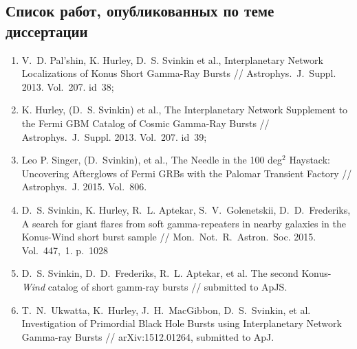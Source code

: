 \subsection*{\Large Список работ, опубликованных по теме диссертации}
\begin{enumerate}
\item V.~D. Pal'shin, K. Hurley, D.~S. Svinkin et al., Interplanetary Network Localizations of
Konus Short Gamma-Ray Bursts // Astrophys.~J.~Suppl. 2013. Vol.~207. id~38;
\item K. Hurley, (D.~S. Svinkin) et al., The Interplanetary Network Supplement to 
the Fermi GBM Catalog of Cosmic Gamma-Ray Bursts // Astrophys.~J.~Suppl. 2013. Vol.~207. id~39;
\item Leo P. Singer, (D.~Svinkin), et al., The Needle in the 100 deg$^2$ Haystack: 
Uncovering Afterglows of Fermi GRBs with the Palomar Transient Factory // 
Astrophys.~J. 2015. Vol.~806.
\item D.~S. Svinkin, K. Hurley, R.~L. Aptekar, S.~V.~Golenetskii, D.~D.~Frederiks, 
A search for giant flares from soft gamma-repeaters in nearby galaxies in the 
Konus-Wind short burst sample // Mon.~Not.~R.~Astron.~Soc. 2015. Vol.~447,~1. p.~1028
\item D.~S. Svinkin, D.~D.~Frederiks, R.~L. Aptekar, et al.
The second Konus-\textit{Wind} catalog of short gamm-ray bursts // submitted to ApJS.
\item T.~N.~Ukwatta, K.~Hurley, J.~H.~MacGibbon, D.~S.~Svinkin, et al.
Investigation of Primordial Black Hole Bursts using Interplanetary Network Gamma-ray Bursts // 
arXiv:1512.01264, submitted to ApJ.

\end{enumerate}

\renewcommand{\refname}{Литература, цитируемая в автореферате}


